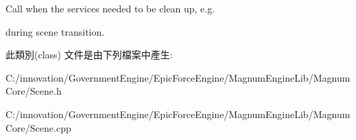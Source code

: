Call when the services needed to be clean up, e.\+g. 

during scene transition. 

此類別(class) 文件是由下列檔案中產生\+:\begin{DoxyCompactItemize}
\item 
C\+:/innovation/\+Government\+Engine/\+Epic\+Force\+Engine/\+Magnum\+Engine\+Lib/\+Magnum\+Core/Scene.\+h\item 
C\+:/innovation/\+Government\+Engine/\+Epic\+Force\+Engine/\+Magnum\+Engine\+Lib/\+Magnum\+Core/Scene.\+cpp\end{DoxyCompactItemize}
